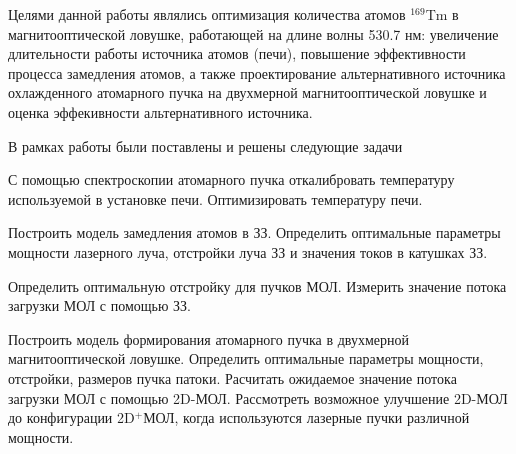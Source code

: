 




Целями данной работы являлись оптимизация количества атомов ${}^{169}$Tm в магнитооптической ловушке, работающей на длине волны 530.7 нм: увеличение длительности работы источника атомов (печи), повышение эффективности процесса замедления атомов, а также проектирование альтернативного источника охлажденного атомарного пучка на двухмерной магнитооптической ловушке и оценка эффекивности альтернативного источника.

В рамках работы были поставлены и решены следующие задачи 
\begin{enumerate*}
	\item С помощью спектроскопии атомарного пучка откалибровать температуру используемой в установке печи. Оптимизировать температуру печи.
	\item Построить модель замедления атомов в ЗЗ. Определить оптимальные параметры мощности лазерного луча, отстройки луча ЗЗ и значения токов в катушках ЗЗ. 
	\item Определить оптимальную отстройку для пучков МОЛ. Измерить значение потока загрузки МОЛ с помощью ЗЗ. 
	\item Построить модель формирования атомарного пучка в двухмерной магнитооптической ловушке. Определить оптимальные параметры мощности, отстройки, размеров пучка патоки. Расчитать ожидаемое значение потока загрузки МОЛ с помощью 2D-МОЛ. Рассмотреть возможное улучшение 2D-МОЛ до конфигурации 2D${}^+$МОЛ, когда используются лазерные пучки различной мощности. 
\end{enumerate*}


